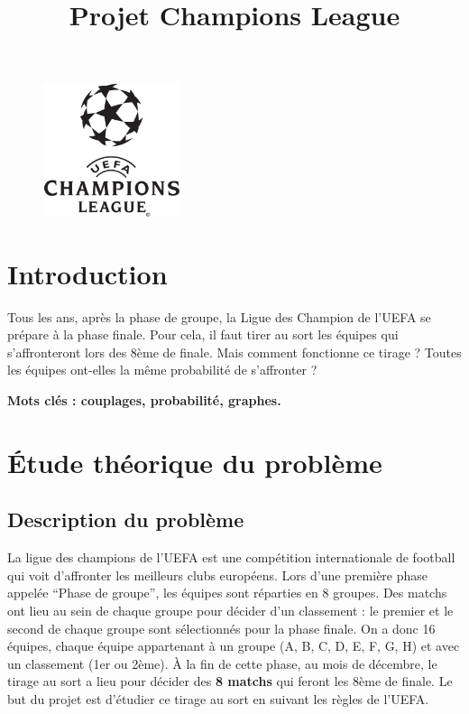 \documentclass{../ficheTDTP}
\title{Projet Champions League}
\begin{document}
\maketitle

\begin{figure}[h]
\vspace{-5mm}
	\begin{center}
            \includegraphics[width=4cm]{championsleague.png}
        \end{center}
	
\end{figure}

\section*{Introduction}

Tous les ans, après la phase de groupe, la Ligue des Champion de l'UEFA se prépare à la phase finale. Pour cela, il faut tirer au sort les équipes qui s'affronteront lors des 8ème de finale. Mais comment fonctionne ce tirage ? Toutes les équipes ont-elles la même probabilité de s'affronter ?

\textbf{Mots clés : couplages, probabilité, graphes.}



\section{\'Etude théorique du problème}

\subsection{Description du problème}

La ligue des champions de l'UEFA est une compétition internationale de football qui voit d'affronter les meilleurs clubs européens. Lors d'une première phase appelée ``Phase de groupe'', les équipes sont réparties en 8 groupes. Des matchs ont lieu au sein de chaque groupe pour décider d'un classement : le premier et le second de chaque groupe sont sélectionnés pour la phase finale. On a donc 16 équipes, chaque équipe appartenant à un groupe (A, B, C, D, E, F, G, H) et avec un classement (1er ou 2ème). \`A la fin de cette phase, au mois de décembre, le tirage au sort a lieu pour décider des \textbf{8 matchs} qui feront les 8ème de finale. Le but du projet est d'étudier ce tirage au sort en suivant les règles de l'UEFA.
\end{document}
